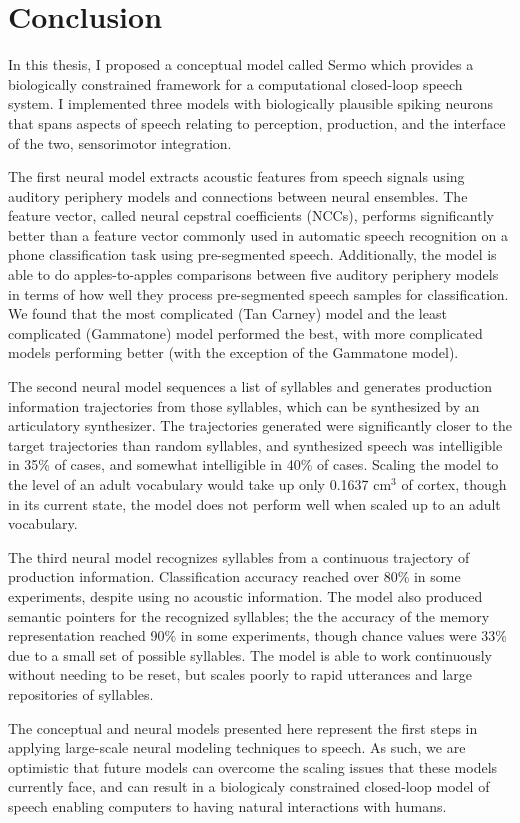 \chapter{Conclusion}
\label{chapt:conclusion}

In this thesis,
I proposed a conceptual model
called Sermo which
provides a biologically constrained framework
for a computational closed-loop speech system.
I implemented three models
with biologically plausible spiking neurons
that spans aspects of speech
relating to perception, production,
and the interface of the two,
sensorimotor integration.

The first neural model
extracts acoustic features
from speech signals
using auditory periphery models
and connections between neural ensembles.
The feature vector,
called neural cepstral coefficients (NCCs),
performs significantly better than
a feature vector commonly used
in automatic speech recognition
on a phone classification task
using pre-segmented speech.
Additionally, the model is able
to do apples-to-apples comparisons
between five auditory periphery models
in terms of how well they
process pre-segmented speech samples
for classification.
We found that the
most complicated (Tan Carney) model
and the least complicated (Gammatone) model
performed the best,
with more complicated models
performing better
(with the exception of the Gammatone model).

The second neural model
sequences a list of syllables
and generates production information trajectories
from those syllables,
which can be synthesized by an articulatory synthesizer.
The trajectories generated were
significantly closer
to the target trajectories than
random syllables,
and synthesized speech was intelligible
in 35\% of cases,
and somewhat intelligible in 40\% of cases.
Scaling the model to the level of
an adult vocabulary would take up
only 0.1637 cm$^3$ of cortex,
though in its current state,
the model does not perform well
when scaled up to an adult vocabulary.

The third neural model
recognizes syllables from a continuous
trajectory of production information.
Classification accuracy reached
over 80\% in some experiments,
despite using no acoustic information.
The model also produced semantic pointers
for the recognized syllables;
the the accuracy of the memory representation
reached 90\% in some experiments,
though chance values were 33\% due to
a small set of possible syllables.
The model is able to work continuously
without needing to be reset,
but scales poorly to rapid utterances
and large repositories of syllables.

The conceptual and neural models
presented here
represent the first steps
in applying large-scale neural modeling techniques
to speech.
As such, we are optimistic that
future models can overcome
the scaling issues that these models
currently face,
and can result in a biologicaly constrained
closed-loop model of speech
enabling computers to
having natural interactions with humans.
